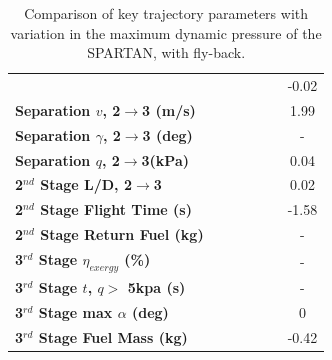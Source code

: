 \begin{table}[ht]
\begin{tabular}{l c c c c c c}
		& \secondthirdSeparationAltqForty
		& \secondthirdSeparationAltqFortyFive
		& \secondthirdSeparationAltqStandard
		& \secondthirdSeparationAltqFiftyFive
		& \secondthirdSeparationAltqSixty
		&-0.02
		\\
		\textbf{Separation $v$, 2$\rightarrow$3 (m/s)}
		& \secondthirdSeparationvqForty
		& \secondthirdSeparationvqFortyFive
		& \secondthirdSeparationvqStandard
		& \secondthirdSeparationvqFiftyFive
		& \secondthirdSeparationvqSixty
		&1.99
		\\
		\textbf{Separation $\gamma$, 2$\rightarrow$3 (deg)}
		& \secondthirdSeparationgammaqForty
		& \secondthirdSeparationgammaqFortyFive
		& \secondthirdSeparationgammaqStandard
		& \secondthirdSeparationgammaqFiftyFive
		& \secondthirdSeparationgammaqSixty
		& -
		\\
		\textbf{Separation $q$, 2$\rightarrow$3(kPa)}
		& \secondthirdSeparationqqForty
		& \secondthirdSeparationqqFortyFive
		& \secondthirdSeparationqqStandard
		& \secondthirdSeparationqqFiftyFive
		& \secondthirdSeparationqqSixty
		&0.04
		\\
		\textbf{2$^{nd}$ Stage L/D, 2$\rightarrow$3}
		& \secondthirdSeparationLDqForty
		& \secondthirdSeparationLDqFortyFive
		& \secondthirdSeparationLDqStandard
		& \secondthirdSeparationLDqFiftyFive
		& \secondthirdSeparationLDqSixty
		&0.02
		\\
		\textbf{2$^{nd}$ Stage Flight Time (s)}
		& \secondFlightTimeqForty
		& \secondFlightTimeqFortyFive
		& \secondFlightTimeqStandard
		& \secondFlightTimeqFiftyFive
		& \secondFlightTimeqSixty
		&-1.58
		\\
		\textbf{2$^{nd}$ Stage Return Fuel (kg)}
		& \returnFuelqForty
		& \returnFuelqFortyFive
		& \returnFuelqStandard
		& \returnFuelqFiftyFive
		& \returnFuelqSixty
		& -
		\\
		\hline 
		\textbf{3$^{rd}$ Stage $\eta_{exergy}$ (\%)}
		& \textbf{\thirddExergyEffqForty}
		& \textbf{\thirddExergyEffqFortyFive}
		& \textbf{\thirddExergyEffqStandard}
		& \textbf{\thirddExergyEffqFiftyFive}
		& \textbf{\thirddExergyEffqSixty}
		& -
		\\
		
		\textbf{3$^{rd}$ Stage $t$, $q >$ 5kpa (s)}
		& \thirdqOverFiveqForty
		& \thirdqOverFiveqFortyFive
		& \thirdqOverFiveqStandard
		& \thirdqOverFiveqFiftyFive
		& \thirdqOverFiveqSixty
		& -
		\\
		\textbf{3$^{rd}$ Stage max $\alpha$ (deg)}
		& \thirdmaxAoAqForty
		& \thirdmaxAoAqFortyFive
		& \thirdmaxAoAqStandard
		& \thirdmaxAoAqFiftyFive
		& \thirdmaxAoAqSixty
		&0
		\\
		\textbf{3$^{rd}$ Stage Fuel Mass (kg)}
		& \thirdmFuelqForty
		& \thirdmFuelqFortyFive
		& \thirdmFuelqStandard
		& \thirdmFuelqFiftyFive
		& \thirdmFuelqSixty
		&-0.42
		\\
		\hline 
	\end{tabular} 
	\caption{Comparison of key trajectory parameters with variation in the maximum dynamic pressure of the SPARTAN, with fly-back.}
	\label{tab:qvarreturn}
\end{table}


